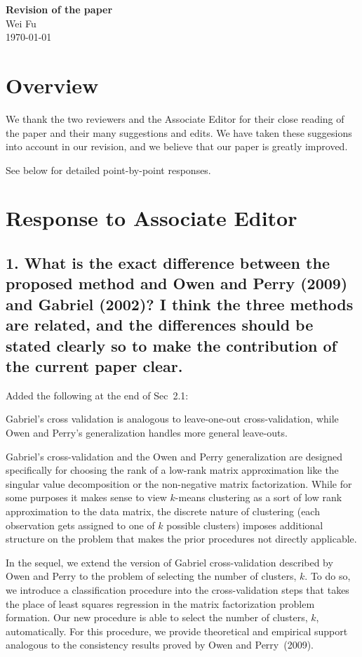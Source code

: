 \documentclass[11pt]{article}
\begin{document}
\begin{center}\textbf{\LARGE Revision of the paper}\\
Wei Fu \\
\today \\ \end{center}

\section{Overview}

We thank the two reviewers and the Associate Editor for their close reading of
the paper and their many suggestions and edits. We have taken these suggesions
into account in our revision, and we believe that our paper is greatly
improved.

See below for detailed point-by-point responses.


\section{Response to Associate Editor}

\subsection{1. What is the exact difference between the proposed method and Owen and
Perry (2009) and Gabriel (2002)? I think the three methods are related, and
the differences should be stated clearly so to make the contribution of the
current paper clear.}

Added the following at the end of Sec~2.1:

Gabriel's cross validation is analogous to leave-one-out cross-validation,
while Owen and Perry's generalization handles more general leave-outs.

Gabriel's cross-validation and the Owen and Perry generalization are designed
specifically for choosing the rank of a low-rank matrix approximation like the
singular value decomposition or the non-negative matrix factorization. While
for some purposes it makes sense to view $k$-means clustering as a sort of low
rank approximation to the data matrix, the discrete nature of clustering (each
observation gets assigned to one of $k$ possible clusters) imposes additional
structure on the problem that makes the prior procedures not directly
applicable.

In the sequel, we extend the version of Gabriel cross-validation described by
Owen and Perry to the problem of selecting the number of clusters, $k$. To do
so, we introduce a classification procedure into the cross-validation steps
that takes the place of least squares regression in the matrix factorization
problem formation. Our new procedure is able to select the number of clusters,
$k$, automatically. For this procedure, we provide theoretical and empirical
support analogous to the consistency results proved by Owen and Perry~(2009).
\end{document}
